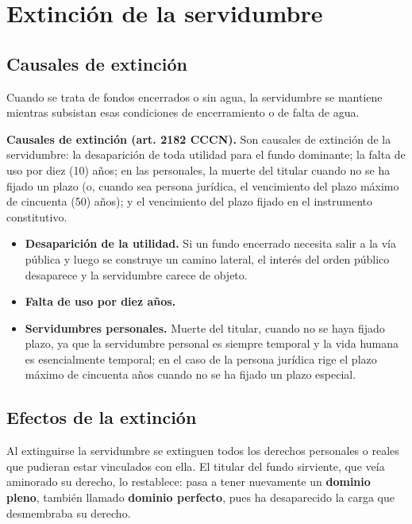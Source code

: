 \documentclass[12pt,oneside]{book}
\begin{document}
\chapter{Extinción de la servidumbre}

\section{Causales de extinción}

Cuando se trata de fondos encerrados o sin agua, la servidumbre se mantiene mientras subsistan esas condiciones de encerramiento o de falta de agua.

\begin{important}
\textbf{Causales de extinción (art. 2182 CCCN).} Son causales de extinción de la servidumbre: la desaparición de toda utilidad para el fundo dominante; la falta de uso por diez (10) años; en las personales, la muerte del titular cuando no se ha fijado un plazo (o, cuando sea persona jurídica, el vencimiento del plazo máximo de cincuenta (50) años); y el vencimiento del plazo fijado en el instrumento constitutivo.
\end{important}

\begin{itemize}
    \item \textbf{Desaparición de la utilidad.} Si un fundo encerrado necesita salir a la vía pública y luego se construye un camino lateral, el interés del orden público desaparece y la servidumbre carece de objeto.
    \item \textbf{Falta de uso por diez años.}
    \item \textbf{Servidumbres personales.} Muerte del titular, cuando no se haya fijado plazo, ya que la servidumbre personal es siempre temporal y la vida humana es esencialmente temporal; en el caso de la persona jurídica rige el plazo máximo de cincuenta años cuando no se ha fijado un plazo especial.
\end{itemize}

\section{Efectos de la extinción}

Al extinguirse la servidumbre se extinguen todos los derechos personales o reales que pudieran estar vinculados con ella. El titular del fundo sirviente, que veía aminorado su derecho, lo restablece: pasa a tener nuevamente un \textbf{dominio pleno}, también llamado \textbf{dominio perfecto}, pues ha desaparecido la carga que desmembraba su derecho.
\end{document}
